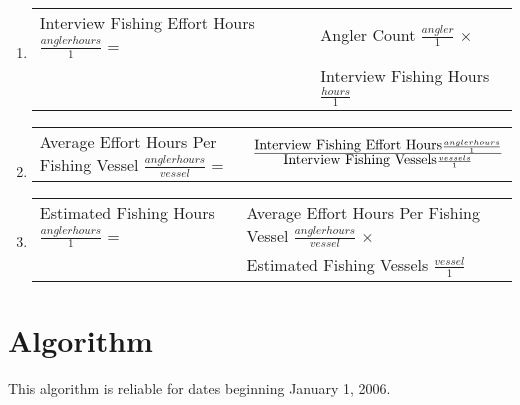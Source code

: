 \documentclass[letterpaper,12pt]{article}
\newcommand{\fraction}[1]{\textrm{\normalsize{#1}}}
\begin{document}
\begin{enumerate}
\item
\begin{tabular}{l@{ }l@{ }}
	Interview Fishing Effort Hours $ \frac {anglerhours} {1} $ =
		& Angler Count $ \frac {angler} {1} $ $\times$ \\
		& Interview Fishing Hours $ \frac {hours} {1} $ \\
\end{tabular}

\item
\begin{tabular}{l@{ }l@{ }}
	Average Effort Hours Per Fishing Vessel
		$ \frac {anglerhours} {vessel} $ =
		& $ \frac	{\fraction{Interview Fishing Effort Hours}
				 \frac {anglerhours} {1}}
				{\fraction{Interview Fishing Vessels}
				 \frac {vessels} {1}} $
\end{tabular}

\item
\begin{tabular}{l@{ }l@{ }}
	Estimated Fishing Hours $ \frac {anglerhours} {1} $ =
		& Average Effort Hours Per Fishing Vessel
			$ \frac {anglerhours} {vessel} $ $\times$ \\
		& Estimated Fishing Vessels
			$ \frac {vessel} {1} $
\end{tabular}

\end{enumerate}

\section{Algorithm}

This algorithm is reliable for dates beginning January 1, 2006\footnotemark[1].
\end{document}
